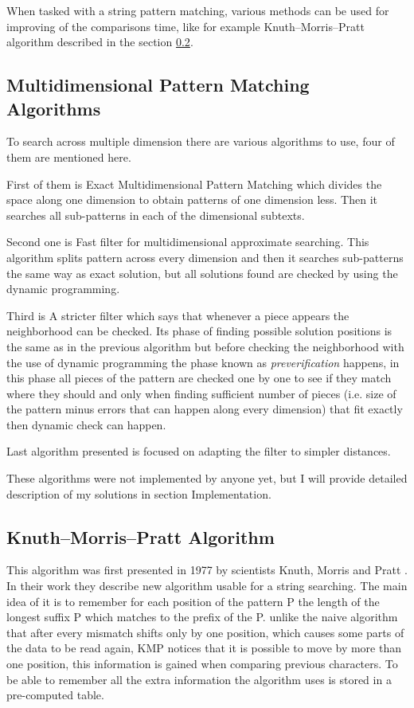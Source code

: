 When tasked with a string pattern matching, various methods can be used for improving of the comparisons time, like for example Knuth--Morris--Pratt algorithm described in the section \ref{KMP}.

\subsection{Multidimensional Pattern Matching Algorithms}
To search across multiple dimension there are various algorithms to use, four of them are mentioned here. 

First of them is Exact Multidimensional Pattern Matching which divides the space along one dimension to obtain patterns of one dimension less. Then it searches all sub-patterns in each of the dimensional subtexts.

Second one is Fast filter for multidimensional approximate searching. This algorithm splits pattern across every dimension and then it searches sub-patterns the same way as exact solution, but all solutions found are checked by using the dynamic programming. 

Third is A stricter filter which says that whenever a piece appears the neighborhood can be checked. Its phase of finding possible solution positions is the same as in the previous algorithm but before checking the neighborhood with the use of dynamic programming the phase known as \textit{preverification} happens, in this phase all pieces of the pattern are checked one by one to see if they match where they should and only when finding sufficient number of pieces (i.e. size of the pattern minus errors that can happen along every dimension) that fit exactly then dynamic check can happen. 

Last algorithm presented is focused on adapting the filter to simpler distances. \cite{mdApproxPM}

These algorithms were not implemented by anyone yet, but I will provide detailed description of my solutions in section Implementation.

\subsection{Knuth--Morris--Pratt Algorithm}\label{KMP}
This algorithm was first presented in 1977 by scientists Knuth, Morris and Pratt \cite{kmp}. In their work they describe new algorithm usable for a string searching. The main idea of it is to remember for each position of the pattern P the length of the longest suffix P which matches to the prefix of the P. unlike the naive algorithm that after every mismatch shifts only by one position, which causes some parts of the data to be read again, KMP notices that it is possible to 
move by more than one position, this information is gained when comparing previous characters. To be able to remember all the extra information the algorithm uses is stored in a pre-computed table.

